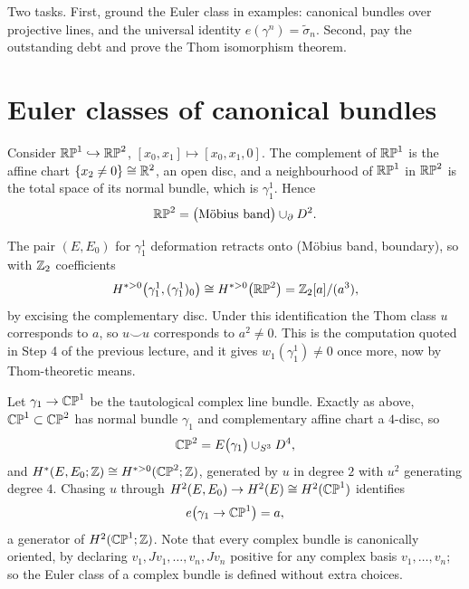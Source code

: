 \lecture

\begin{guiding}
Two tasks. First, ground the Euler class in examples: canonical bundles over
projective lines, and the universal identity $e(\gamma^n)=\tilde\sigma_n$.
Second, pay the outstanding debt and prove the Thom isomorphism theorem.
\end{guiding}

\section{Euler classes of canonical bundles}

\begin{example}\label{ex:mobius-euler}
Consider $\mathbb{RP}^1\hookrightarrow\mathbb{RP}^2$, $[x_0,x_1]\mapsto[x_0,x_1,0]$. The
complement of $\mathbb{RP}^1$ is the affine chart $\{x_2\neq0\}\cong\mathbb{R}^2$, an open disc,
and a neighbourhood of $\mathbb{RP}^1$ in $\mathbb{RP}^2$ is the total space of its normal
bundle, which is $\gamma^1_1$. Hence
\[
\mathbb{RP}^2=\big(\text{M\"obius band}\big)\cup_{\partial}D^2 .
\]

\begin{center}
\end{center}

The pair $(E,E_0)$ for $\gamma^1_1$ deformation retracts onto (M\"obius band,
boundary), so with $\mathbb{Z}_2$ coefficients
\[
H^{*>0}\big(\gamma^1_1,(\gamma^1_1)_0\big)
\cong H^{*>0}\big(\mathbb{RP}^2\big)=\mathbb{Z}_2[a]/(a^3),
\]
by excising the complementary disc. Under this identification the Thom class $u$
corresponds to $a$, so $u\smile u$ corresponds to $a^2\neq0$. This is the
computation quoted in Step 4 of the previous lecture, and it gives
$w_1(\gamma^1_1)\neq0$ once more, now by Thom-theoretic means.
\end{example}

\begin{example}\label{ex:e-gamma-CP1}
Let $\gamma_1\to\mathbb{CP}^1$ be the tautological complex line bundle. Exactly as above,
$\mathbb{CP}^1\subset\mathbb{CP}^2$ has normal bundle $\gamma_1$ and complementary affine chart
a $4$-disc, so
\[
\mathbb{CP}^2=E\big(\gamma_1\big)\cup_{S^3}D^4 ,
\]
and $H^*(E,E_0;\mathbb{Z})\cong H^{*>0}(\mathbb{CP}^2;\mathbb{Z})$, generated by $u$ in degree $2$ with
$u^2$ generating degree $4$. Chasing $u$ through
$H^2(E,E_0)\to H^2(E)\cong H^2(\mathbb{CP}^1)$ identifies
\[
e\big(\gamma_1\to\mathbb{CP}^1\big)=a,
\]
a generator of $H^2(\mathbb{CP}^1;\mathbb{Z})$. Note that every complex bundle is canonically
oriented, by declaring $v_1,Jv_1,\dots,v_n,Jv_n$ positive for any complex basis
$v_1,\dots,v_n$; so the Euler class of a complex bundle is defined without extra
choices.
\end{example}

